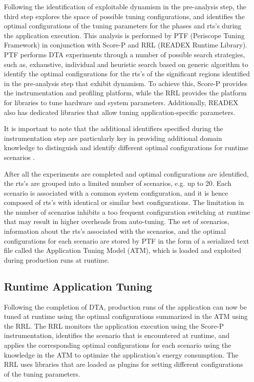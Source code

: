 Following the identification of exploitable dynamism in the pre-analysis step, the third step explores the space of possible tuning configurations, and identifies the optimal configurations of the tuning parameters for the phases and rts's during the application execution. This analysis is performed by PTF (Periscope Tuning Framework) in conjunction with Score-P and RRL (READEX Runtime Library). PTF performs DTA experiments through a number of possible search strategies, such as, exhaustive, individual and heuristic search based on generic algorithm to identify the optimal configurations for the rts's of the significant regions identified in the pre-analysis step that exhibit dynamism. To achieve this, Score-P provides the instrumentation and profiling platform, while the RRL provides the platform for libraries to tune hardware and system parameters. Additionally, READEX also has dedicated libraries that allow tuning application-specific parameters.

It is important to note that the additional identifiers specified during the instrumentation step are particularly key in providing additional domain knowledge to distinguish and identify different optimal configurations for runtime scenarios \cite{PACO17}.

After all the experiments are completed and optimal configurations are identified, the rts's are grouped into a limited number of scenarios, e.g. up to 20. Each scenario is associated with a common system configuration, and it is hence composed of rts's with identical or similar best configurations. The limitation in the number of scenarios inhibits a too frequent configuration switching at runtime that may result in higher overheads from auto-tuning. The set of scenarios, information about the rts's associated with the scenarios, and the optimal configurations for each scenario are stored by PTF in the form of a serialized text file called the Application Tuning Model (ATM), which is loaded and exploited during production runs at runtime.

\subsection{Runtime Application Tuning}
\label{sec:runtime_tuning}

Following the completion of DTA, production runs of the application can now be tuned at runtime using the optimal configurations summarized in the ATM using the RRL. The RRL monitors the application execution using the Score-P instrumentation, identifies the scenario that is encountered at runtime, and applies the corresponding optimal configurations for each scenario using the knowledge in the ATM to optimize the application's energy consumption. The RRL uses libraries that are loaded as plugins for setting different configurations of the tuning parameters.

